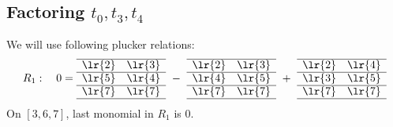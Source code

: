 \subsection{Factoring \(t_0,t_3,t_4\)}

We will use following plucker relations:
\begin{align*}
R_1 :\ \ \ 0 = 
\begin{array}[c]{*{2}c}\cline{1-2}
\lr{2}&\lr{3}\\\cline{1-2}
\lr{5}&\lr{4}\\\cline{1-2}
\lr{7}&\lr{7}\\\cline{1-2}
\end{array}
\ -\ 
\begin{array}[c]{*{2}c}\cline{1-2}
\lr{2}&\lr{3}\\\cline{1-2}
\lr{4}&\lr{5}\\\cline{1-2}
\lr{7}&\lr{7}\\\cline{1-2}
\end{array}
\ +\ 
\begin{array}[c]{*{2}c}\cline{1-2}
\lr{2}&\lr{4}\\\cline{1-2}
\lr{3}&\lr{5}\\\cline{1-2}
\lr{7}&\lr{7}\\\cline{1-2}
\end{array}
\end{align*}
On \([3,6,7]\), last monomial in \(R_1\) is \(0\).


